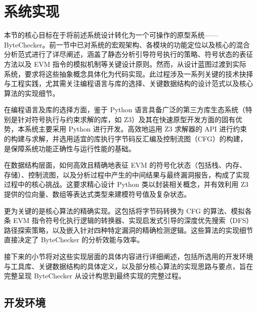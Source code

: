 \documentclass[print, master, vlined, timesmath]{DissertUESTC}
\begin{document}


\section{系统实现}

本节的核心目标在于将前述系统设计转化为一个可操作的原型系统——ByteChecker。前一节中已对系统的宏观架构、各模块的功能定位以及核心的混合分析范式进行了详尽阐述，涵盖了静态分析引导符号执行的策略、符号状态的表征方法以及 EVM 指令的模拟机制等关键设计原则。然而，从设计蓝图过渡到实际系统，要求将这些抽象概念具体化为代码实现。此过程涉及一系列关键的技术抉择与工程实践，尤其需关注编程语言与库的选择、关键数据结构的设计范式以及核心算法的实现细节。

在编程语言及库的选择方面，鉴于 Python 语言具备广泛的第三方库生态系统（特别是针对符号执行与约束求解的库，如 Z3）及其在快速原型开发方面的固有优势，本系统主要采用 Python 进行开发。高效地运用 Z3 求解器的 API 进行约束的构建与求解，并选用适宜的库执行字节码反汇编及控制流图（CFG）的构建，是保障系统功能正确性与运行性能的基础。

在数据结构层面，如何高效且精确地表征 EVM 的符号化状态（包括栈、内存、存储）、控制流图，以及分析过程中产生的中间结果与最终漏洞报告，构成了实现过程中的核心挑战。这要求精心设计 Python 类以封装相关概念，并有效利用 Z3 提供的位向量、数组等表达式类型来建模符号值及复杂状态。

更为关键的是核心算法的精确实现。这包括将字节码转换为 CFG 的算法、模拟各条 EVM 指令符号化执行逻辑的转换器、实现启发式引导的深度优先搜索（DFS）路径探索策略，以及嵌入针对四种特定漏洞的精确检测逻辑。这些算法的实现细节直接决定了 ByteChecker 的分析效能与效率。

接下来的小节将对这些实现层面的具体内容进行详细阐述，包括所选用的开发环境与工具库、关键数据结构的具体定义，以及部分核心算法的实现思路与要点，旨在完整呈现 ByteChecker 从设计构思到最终实现的完整过程。

\subsection{开发环境}
\end{document}

